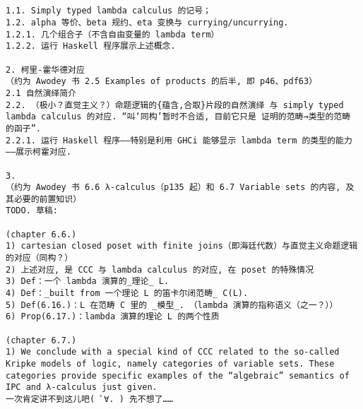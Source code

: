 \documentclass{article}
\begin{document}
\begin{verbatim}


1.1. Simply typed lambda calculus 的记号；
1.2. alpha 等价、beta 规约、eta 变换与 currying/uncurrying. 
1.2.1. 几个组合子（不含自由变量的 lambda term）
1.2.2. 运行 Haskell 程序展示上述概念. 

2. 柯里-霍华德对应
（约为 Awodey 书 2.5 Examples of products 的后半, 即 p46、pdf63）
2.1 自然演绎简介
2.2. （极小？直觉主义？）命题逻辑的{蕴含,合取}片段的自然演绎 与 simply typed lambda calculus 的对应. “叫‘同构’暂时不合适, 目前它只是 证明的范畴→类型的范畴 的函子”. 
2.2.1. 运行 Haskell 程序——特别是利用 GHCi 能够显示 lambda term 的类型的能力——展示柯霍对应. 

3. 
（约为 Awodey 书 6.6 λ-calculus（p135 起）和 6.7 Variable sets 的内容, 及其必要的前置知识）
TODO. 草稿:

(chapter 6.6.)
1) cartesian closed poset with finite joins（即海廷代数）与直觉主义命题逻辑的对应（同构？）
2) 上述对应, 是 CCC 与 lambda calculus 的对应, 在 poset 的特殊情况
3) Def：一个 lambda 演算的_理论_ L. 
4) Def：_built from 一个理论 L 的笛卡尔闭范畴_ C(L). 
5) Def(6.16.)：L 在范畴 C 里的 _模型_. （lambda 演算的指称语义（之一？））
6) Prop(6.17.)：lambda 演算的理论 L 的两个性质

(chapter 6.7.)
1) We conclude with a special kind of CCC related to the so-called Kripke models of logic, namely categories of variable sets. These categories provide specific examples of the “algebraic” semantics of IPC and λ-calculus just given.
一次肯定讲不到这儿吧( ﾟ∀. ) 先不想了……    
\end{verbatim}
	
	
	
\end{document}
